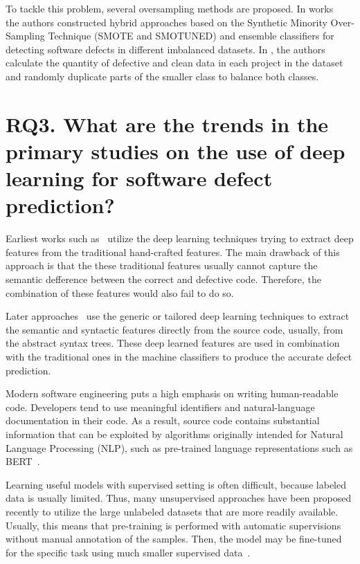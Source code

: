 \documentclass{article}
\begin{document}
To tackle this problem, several oversampling methods are proposed. In works~\cite{AlsawalqahEtAl2017,AgrawalMenzies2018} the authors constructed hybrid approaches based on the Synthetic Minority Over-Sampling Technique (SMOTE and SMOTUNED) and ensemble classifiers for detecting software defects in different imbalanced datasets. In \cite{ShiEtAl2020}, the authors calculate the quantity of defective and clean data in each project in the dataset and randomly duplicate parts of the smaller class to balance both classes. 




\section{RQ3. What are the trends in the primary studies on the use of deep learning for software defect prediction?}

Earliest works such as~\cite{YangEtAl2015} utilize the deep learning techniques trying to extract deep features from the traditional hand-crafted features.
The main drawback of this approach is that the these traditional features usually cannot capture the semantic defference between the correct and defective code. Therefore, the combination of these features would also fail to do so.

Later approaches~\cite{DamEtAl2019,LiEtAl2017} use the generic or tailored deep learning techniques to extract the semantic and syntactic features directly from the source code, usually, from the abstract syntax trees. These deep learned features are used in combination with the traditional ones in the machine classifiers to produce the accurate defect prediction.

Modern software engineering puts a high emphasis on writing human-readable code. Developers tend to use meaningful identifiers and natural-language documentation in their code. As a result, source code contains substantial information that can be exploited by algorithms originally intended for Natural Language Processing (NLP), such as pre-trained language representations such as BERT~\cite{devlin2019bert}. 

Learning useful models with supervised setting is often difficult, because labeled data is usually limited. Thus, many unsupervised approaches have been proposed recently to utilize the large unlabeled datasets that are more readily available. Usually, this means that pre-training is performed with automatic supervisions without manual annotation of the samples. Then, the model may be fine-tuned for the specific task using much smaller supervised data~\cite{kanade20cubert}.
\end{document}

